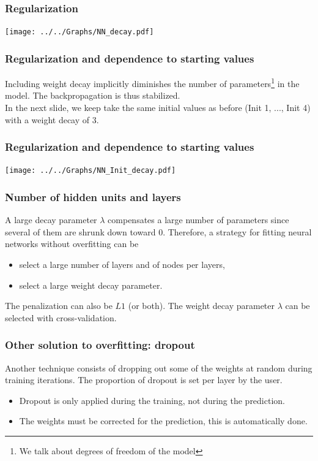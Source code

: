 \begin{frame}
\frametitle{Regularization}
\begin{center}
\texttt{[image: ../../Graphs/NN\_decay.pdf]}
\end{center} 
\end{frame}
\begin{frame}
\frametitle{Regularization and dependence to starting values}
Including weight decay implicitly diminishes the number of parameters\footnote{We talk about degrees of freedom of the model} in the model. The backpropagation is thus stabilized. \\
\vspace{0.3cm}
In the next slide, we keep take the same initial values as before (Init 1, ..., Init 4) with a weight decay of 3. 
\end{frame}
\begin{frame}
\frametitle{Regularization and dependence to starting values}
\begin{center}
\texttt{[image: ../../Graphs/NN\_Init\_decay.pdf]}
\end{center} 
\end{frame}
\begin{frame}
\frametitle{Number of hidden units and layers}
A large decay parameter $\lambda$ compensates a large number of parameters since several of them are shrunk down toward $0$. Therefore, a strategy for fitting neural networks without overfitting can be
\begin{itemize}
\item select a large number of layers and of nodes per layers,
\item select a large weight decay parameter.
\end{itemize}
The penalization can also be $L1$ (or both). The weight decay parameter $\lambda$ can be selected with cross-validation.
\end{frame}
\begin{frame}
\frametitle{Other solution to overfitting: dropout}
Another technique consists of dropping out some of the weights at random during training iterations. The proportion of dropout is set per layer by the user. 
\begin{itemize}
\item Dropout is only applied during the training, not during the prediction.
\item The weights must be corrected for the prediction, this is automatically done.
\end{itemize}
\end{frame}
 
